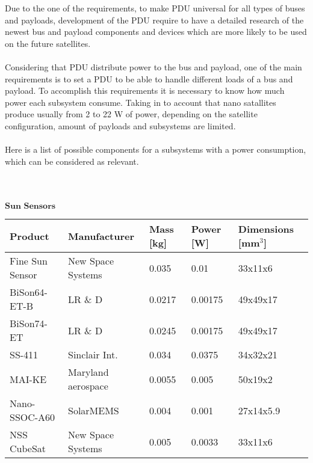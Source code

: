 Due to the one of the requirements, to make PDU universal for all types of buses and payloads, development of the PDU require to have a detailed research of the newest bus and payload components and devices which are more likely to be used on the future satellites.\\
\\
 Considering that PDU distribute power to the bus and payload, one of the main requirements is to set a PDU to be able to handle different loads of a bus and payload. To accomplish this requirements it is necessary to know how much power each subsystem consume. Taking in to account that nano satallites produce usually from 2 to 22 W of power, depending on the satellite configuration, amount of payloads and subsystems are limited. \\
 \\
 Here is a list of possible components for a subsystems with a power consumption, which can be considered as relevant. \\ \\ \\ \\
 
 $\textbf{Sun Sensors}$\\

 
 \begin{tabular}{p{3cm}p{3cm}p{2cm}p{2cm}p{2cm}} \toprule
 	Product & Manufacturer & Mass [kg] & Power [W]& Dimensions [mm$^{3}$]\\ \midrule
 	
 		Fine Sun Sensor & New Space Systems & 0.035 & 0.01 & 33x11x6 \\
 		
 		BiSon64-ET-B & LR \& D & 0.0217 & 0.00175 & 49x49x17 \\
 		
 		BiSon74-ET & LR \& D  & 0.0245 & 0.00175 & 49x49x17  \\
 		
 		SS-411 & Sinclair Int. & 0.034 & 0.0375 & 34x32x21 \\
 	
 		MAI-KE & Maryland aerospace & 0.0055 & 0.005 & 50x19x2 \\
 		
 		Nano-SSOC-A60 & SolarMEMS & 0.004 & 0.001 & 27x14x5.9 \\
 		
 		NSS CubeSat & New Space Systems & 0.005 & 0.0033 & 33x11x6  \\ \bottomrule
 		
 \end{tabular}\\ \\ \\ \\
       
